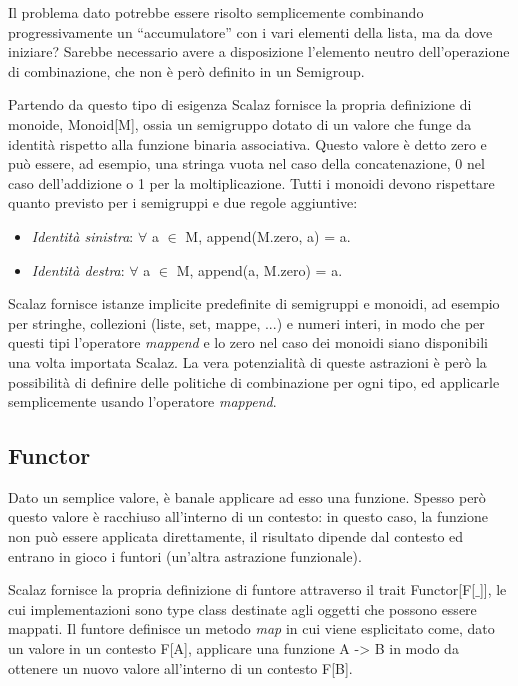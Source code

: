 Il problema dato potrebbe essere risolto semplicemente combinando progressivamente un ``accumulatore'' con i vari elementi della lista, ma da dove iniziare? Sarebbe necessario avere a disposizione l'elemento neutro dell'operazione di combinazione, che non è però definito in un Semigroup.

Partendo da questo tipo di esigenza Scalaz fornisce la propria definizione di monoide, Monoid[M], ossia un semigruppo dotato di un valore che funge da identità rispetto alla funzione binaria associativa. Questo valore è detto zero e può essere, ad esempio, una stringa vuota nel caso della concatenazione, 0 nel caso dell'addizione o 1 per la moltiplicazione. Tutti i monoidi devono rispettare quanto previsto per i semigruppi e due regole aggiuntive:

\begin{itemize}
\item \textit{Identità sinistra}: $\forall$ a $\in$ M, append(M.zero, a) = a.
\item \textit{Identità destra}: $\forall$ a $\in$ M, append(a, M.zero) = a.
\end{itemize}

Scalaz fornisce istanze implicite predefinite di semigruppi e monoidi, ad esempio per stringhe, collezioni (liste, set, mappe, ...) e numeri interi, in modo che per questi tipi l'operatore \textit{mappend} e lo zero nel caso dei monoidi siano disponibili una volta importata Scalaz. La vera potenzialità di queste astrazioni è però la possibilità di definire delle politiche di combinazione per ogni tipo, ed applicarle semplicemente usando l'operatore \textit{mappend}.



\subsection{Functor}

Dato un semplice valore, è banale applicare ad esso una funzione. Spesso però questo valore è racchiuso all'interno di un contesto: in questo caso, la funzione non può essere applicata direttamente, il risultato dipende dal contesto ed entrano in gioco i funtori (un'altra astrazione funzionale).

Scalaz fornisce la propria definizione di funtore attraverso il trait Functor[F[$\_$]], le cui implementazioni sono type class destinate agli oggetti che possono essere mappati. Il funtore definisce un metodo \textit{map} in cui viene esplicitato come, dato un valore in un contesto F[A], applicare una funzione A -> B in modo da ottenere un nuovo valore all'interno di un contesto F[B].

